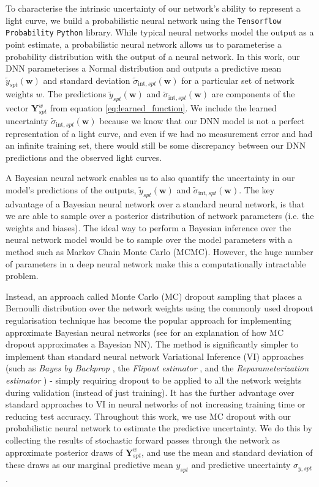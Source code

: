 \documentclass[fleqn,usenatbib]{mnras}
\begin{document}
To characterise the intrinsic uncertainty of our network's ability to represent a light curve, we build a probabilistic neural network using the \texttt{Tensorflow Probability} \texttt{Python} library. While typical neural networks model the output as a point estimate, a probabilistic neural network allows us to parameterise a probability distribution with the output of a neural network. In this work, our DNN parameterises a Normal distribution and outputs a predictive mean $\tilde{y}_{spt}(\bm{w})$ and standard deviation $\tilde{\sigma}_{\mathrm{int},spt}(\bm{w})$ for a particular set of network weights $w$. The predictions $\tilde{y}_{spt}(\bm{w})$ and $\tilde{\sigma}_{\mathrm{int},spt}(\bm{w})$ are components of the vector $\bm{Y}^w_{spt}$ from equation \ref{eq:learned_function}. We include the learned uncertainty $\tilde{\sigma}_{\mathrm{int},spt} (\bm{w})$ because we know that our DNN model is not a perfect representation of a light curve, and even if we had no measurement error and had an infinite training set, there would still be some discrepancy between our DNN predictions and the observed light curves. 

A Bayesian neural network enables us to also quantify the uncertainty in our model's predictions of the outputs, $\tilde{y}_{spt}(\bm{w})$ and $\tilde{\sigma}_{\mathrm{int},spt}(\bm{w})$. The key advantage of a Bayesian neural network over a standard neural network, is that we are able to sample over a posterior distribution of network parameters (i.e. the weights and biases). The ideal way to perform a Bayesian inference over the neural network model would be to sample over the model parameters with a method such as Markov Chain Monte Carlo (MCMC). However, the huge number of parameters in a deep neural network make this a computationally intractable problem. 

Instead, an approach called Monte Carlo (MC) dropout sampling that places a Bernoulli distribution over the network weights using the commonly used dropout regularisation technique has become the popular approach for implementing approximate Bayesian neural networks (see \citet{Gal2015} for an explanation of how MC dropout approximates a Bayesian NN). The method is significantly simpler to implement than standard neural network Variational Inference (VI) approaches (such as \textit{Bayes by Backprop} \citep{Blundell2015BayesbyBackprop}, the \textit{Flipout estimator} \citep{Wen2018Flipout}, and the \textit{Reparameterization estimator} \citep{Kingma2013DenseReparemerisation}) - simply requiring dropout to be applied to all the network weights during validation (instead of just training). It has the further advantage over standard approaches to VI in neural networks of not increasing training time or reducing test accuracy. Throughout this work, we use MC dropout with our probabilistic neural network to estimate the predictive uncertainty. We do this by collecting the results of stochastic forward passes through the network as approximate posterior draws of $\bm{Y}^w_{spt}$, and use the mean and standard deviation of these draws as our marginal predictive mean $y_{spt}$ and predictive uncertainty $\sigma_{y,{spt}}$.
\end{document}
